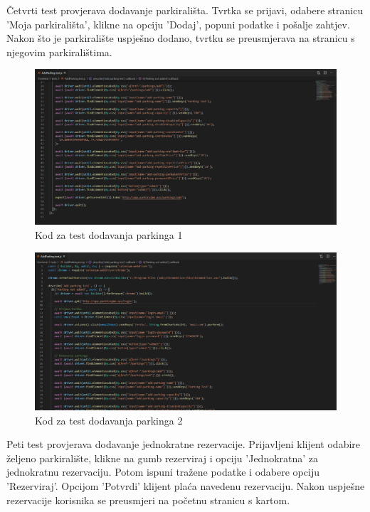 			
			Četvrti test provjerava dodavanje parkirališta. Tvrtka se prijavi, odabere stranicu 'Moja parkirališta', klikne na opciju 'Dodaj', popuni podatke i pošalje zahtjev. Nakon što je parkiralište uspješno dodano, tvrtku se preusmjerava na stranicu s njegovim parkiralištima.

\begin{figure}[H]
	\includegraphics[width=1\linewidth]{images/AddParking1.png}
	\caption{Kod za test dodavanja parkinga 1}
	\label{fig:AddParking test - kod 1} 
\end{figure}

\begin{figure}[H]
	\includegraphics[width=1\linewidth]{images/AddParking2.png}
	\caption{Kod za test dodavanja parkinga 2}
	\label{fig:AddParking test - kod 2} 
\end{figure}

			Peti test provjerava dodavanje jednokratne rezervacije. Prijavljeni klijent odabire željeno parkiralište, klikne na gumb rezerviraj i opciju 'Jednokratna' za jednokratnu rezervaciju. Potom ispuni tražene podatke i odabere opciju 'Rezerviraj'. Opcijom 'Potvrdi' klijent plaća navedenu rezervaciju. Nakon uspješne rezervacije korisnika se preusmjeri na početnu stranicu s kartom.

